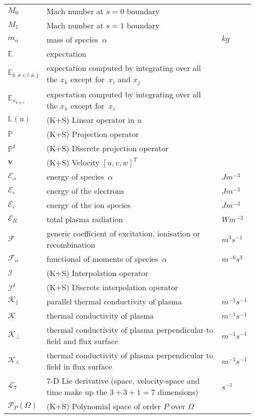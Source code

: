 \begin{longtable}{|p{3.0cm}|p{10.0cm}|p{3.0cm}|}
$M_0$ & Mach number at $s=0$ boundary & \\
$M_1$ & Mach number at $s=1$ boundary & \\
$m_\alpha$ & mass of species~$\alpha$ & $kg$ \\
$\mathbb{E}$ & expectation  & \\
$\mathbb{E}_{k\neq i, l\neq j}$ & expectation computed by integrating over all the $x_k$ except for~$x_i$ and  $x_j$  & \\
$\mathbb{E}_{x_{k\neq i}}$ & expectation computed by integrating over all the $x_k$ except for~$x_i$  & \\
$\mathbb{L}(u)$ &  (K+S) Linear operator in $u$ & \\
$\mathbb{P}$ &  (K+S) Projection operator & \\
$\mathbb{P}^{\delta}$ &  (K+S) Discrete projection operator & \\
${\mathbf v}$ &  (K+S) Velocity $[u, v, w]^T$ & \\
$\mathcal{E}_\alpha$ & energy of species~$\alpha$ & $J m^{-3}$ \\
$\mathcal{E}_e$ & energy of the electrons & $J m^{-3}$ \\
$\mathcal{E}_i$ & energy of the ion species & $J m^{-3}$ \\
$\mathcal{E}_R$ & total plasma radiation & $W m^{-3}$ \\
$\mathcal{F}$ & generic coefficient of excitation, ionisation or recombination  & $m^3 s^{-1}$ \\
$\mathcal{F}_\alpha$ & functional of moments of species~$\alpha$  & $m^{-6} s^3$ \\
$\mathcal{I}$ &  (K+S) Interpolation operator & \\
$\mathcal{I}^{\delta}$ &  (K+S) Discrete interpolation operator & \\
$\mathcal{K}_{\|}$ & parallel thermal conductivity of plasma & $m^{-1}s^{-1}$ \\
$\mathcal{K}$ & thermal conductivity of plasma & $m^{-1}s^{-1}$ \\
$\mathcal{K}_{\perp}$ & thermal conductivity of plasma perpendicular to field and flux surface & $m^{-1}s^{-1}$ \\
$\mathcal{K}_{\wedge}$ & thermal conductivity of plasma perpendicular to field in flux surface & $m^{-1}s^{-1}$ \\
$\mathcal{L}_7$ & 7-D Lie derivative (space, velocity-space and time make up the $3+3+1=7$ dimensions)  & $s^{-1}$ \\
$\mathcal{P}_{P}(\Omega)$ &  (K+S) Polynomial space of order $P$ over $\Omega$ & \\

\end{longtable}
